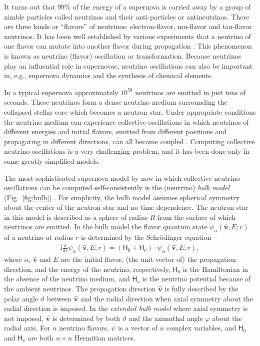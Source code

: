 \documentclass{sig-alternate}
\newcommand{\bhv}{\hat{\mathbf{v}}}
\newcommand{\rmi}{\mathrm{i}}
\newcommand{\rmd}{\mathrm{d}}
\newcommand{\sfH}{\mathsf{H}}
\begin{document}
It turns out
that 99\% of the energy of a supernova is carried away
by a group of nimble particles called neutrinos and their
anti-particles or antineutrinos. There are three kinds
or ``flavors'' of neutrinos: electron-flavor, mu-flavor and tau-flavor
neutrinos. It has been well established by various experiments that
a neutrino of one flavor can mutate into another flavor during
propagation \cite{Agashe:2014kda}. This phenomenon is known as neutrino
(flavor) oscillation 
or transformation. Because neutrinos play an influential role in supernovae,
neutrino oscillations can also be important in, e.g., supernova
dynamics and the synthesis of chemical elements.

In a typical supernova approximately $10^{58}$ neutrinos are emitted
in just tens of seconds. These neutrinos form a dense neutrino medium
surrounding the collapsed stellar core which becomes a neutron
star. Under appropriate conditions the neutrino medium can experience
collective oscillations in which neutrinos of different energies and
initial flavors, emitted from different positions and propagating in
different directions, can all become coupled \cite{Duan:2010bg}.
Computing collective neutrino oscillations is a very challenging
problem, and it has been done only in some greatly simplified models.

The most sophisticated supernova model by now in which collective neutrino
oscillations can be computed self-consistently is the (neutrino) \emph{bulb
model} (Fig.~\ref{fig:bulb}) \cite{Duan_Simulation_2006}. For
simplicity, the bulb model assumes 
spherical symmetry about the center of the neutron star and 
no time dependence. The neutron star in this model is
described as a sphere of radius $R$ from the surface of which
neutrinos are emitted. 
In the bulb model the flavor
quantum state $\psi_\alpha(\bhv,E;r)$ of a neutrino at radius $r$ is
determined by the Schr\"odinger equation
\begin{align}
\rmi\frac{\rmd}{\rmd r}\psi_\alpha(\bhv,E;r)
= (\sfH_0 + \sfH_\nu)\cdot \psi_\alpha(\bhv,E;r),
\label{eq:eom}
\end{align}
where $\alpha$, $\bhv$ and $E$ are the initial flavor, (the unit vector
of) the propagation direction, and the energy of the neutrino,
respectively, $\sfH_0$ is the Hamiltonian in the absence of the
neutrino medium, and $\sfH_\nu$ is the neutrino potential because of
the ambient neutrinos. 
The propagation direction $\bhv$ is fully described by the polar angle
$\vartheta$ between $\bhv$ and the radial direction when axial
symmetry about the radial direction is imposed. In the \emph{extended bulb
model} \cite{Mirizzi:2013rla} where axial symmetry is not imposed,
$\bhv$ is determined by both $\vartheta$ and the azimuthal angle
$\varphi$ about the radial axis.
For $n$ neutrino flavors, $\psi$ is a vector of
$n$ complex variables, and $\sfH_0$ and $\sfH_\nu$ are both $n\times n$
Hermitian matrices. 
\end{document}
